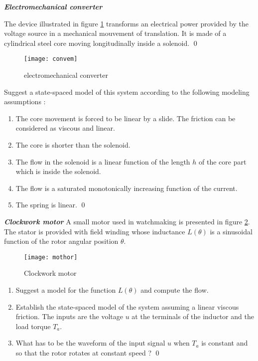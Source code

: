 \begin{exercice}{\bf \em Electromechanical converter }

The device illustrated in figure \ref{fig:convem} transforms an electrical power provided
by the voltage source in a mechanical mouvement of translation.  It is made of a cylindrical steel core moving
longitudinally inside a solenoid. \qed
\begin{figure}[htbp]
\begin{center}
\texttt{[image: convem]}
\caption{electromechanical converter}
\label{fig:convem}
\end{center}
\end{figure}

Suggest a state-spaced model of this system according to the following  modeling assumptions :
\begin{enumerate}
\item The core movement is forced to be linear by a slide.  The friction can be considered as viscous and linear.
\item The core is shorter than the solenoid.
\item The flow in the solenoid is a linear function of the length $h$ of the core part which is inside the solenoid.
\item The flow is a saturated monotonically increasing function of the current.
\item The spring is linear. \qed
\end{enumerate}
\end{exercice}

\begin{exercice}{\bf \em Clockwork motor}
A small motor used in watchmaking is presented in figure
\ref{fig:mothor}.  The stator is provided with field winding whose inductance
$L(\theta)$ is a sinusoidal function of the rotor angular position $\theta$.
\begin{figure}[htbp]
\begin{center}
\texttt{[image: mothor]}
\caption{Clockwork motor}
\label{fig:mothor}
\end{center}
\end{figure}
\begin{enumerate}
\item Suggest a model for the function $L(\theta)$ and compute the flow.
\item Establish the state-spaced model of the system assuming a linear viscous friction. The inputs are the 
voltage $u$ at the terminals of the inductor and the load torque $T_a$.
\item What has to be the waveform of the input signal $u$ when $T_a$ is constant and so that the rotor rotates at 
constant speed ?  \qed
\end{enumerate}
\end{exercice}
\newpage

